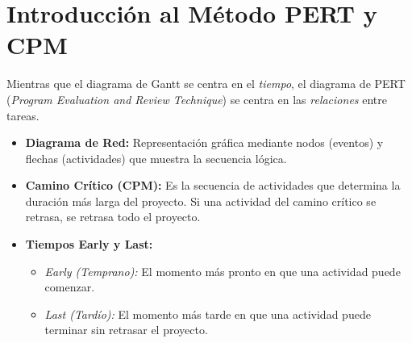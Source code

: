 \documentclass[../main]{subfiles}
\begin{document}
\section{Introducción al Método PERT y CPM}
Mientras que el diagrama de Gantt se centra en el \textit{tiempo}, el
diagrama de PERT (\textit{Program Evaluation and Review Technique})
se centra en las \textit{relaciones} entre tareas.

\begin{itemize}
  \item \textbf{Diagrama de Red:} Representación gráfica mediante
    nodos (eventos) y flechas (actividades) que muestra la secuencia lógica.
  \item \textbf{Camino Crítico (CPM):} Es la secuencia de actividades
    que determina la duración más larga del proyecto. Si una
    actividad del camino crítico se retrasa, se retrasa todo el proyecto.
  \item \textbf{Tiempos Early y Last:}
    \begin{itemize}
      \item \textit{Early (Temprano):} El momento más pronto en que
        una actividad puede comenzar.
      \item \textit{Last (Tardío):} El momento más tarde en que una
        actividad puede terminar sin retrasar el proyecto.
    \end{itemize}
\end{itemize}

\newpage

\end{document}
